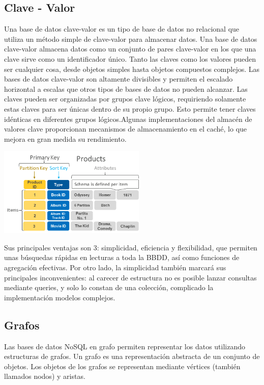 \documentclass[twoside,twocolumn]{article}
\begin{document}
\subsection{Clave - Valor}
Una base de datos clave-valor es un tipo de base de datos no relacional que utiliza un método simple de clave-valor para almacenar datos. Una base de datos clave-valor almacena datos como un conjunto de pares clave-valor en los que una clave sirve como un identificador único. Tanto las claves como los valores pueden ser cualquier cosa, desde objetos simples hasta objetos compuestos complejos. Las bases de datos clave-valor son altamente divisibles y permiten el escalado horizontal a escalas que otros tipos de bases de datos no pueden alcanzar.
Las claves pueden ser organizadas por grupos clave lógicos, requiriendo solamente estas claves para ser únicas dentro de su propio grupo. Esto permite tener claves idénticas en diferentes grupos lógicos.Algunas implementaciones del almacén de valores clave proporcionan mecanismos de almacenamiento en el caché, lo que mejora en gran medida su rendimiento.
\begin{center}
	\includegraphics[width=7cm]{./Imagenes/clavevalor} 
\end{center}


Sus principales ventajas son 3: simplicidad, eficiencia y flexibilidad, que permiten unas búsquedas rápidas en lecturas a toda la BBDD, así como funciones de agregación efectivas. Por otro lado, la simplicidad también marcará sus principales inconvenientes: al carecer de estructura no es posible lanzar consultas mediante queries, y solo lo constan de una colección, complicado la implementación modelos complejos.


\subsection{Grafos}

Las bases de datos NoSQL en grafo permiten representar los datos utilizando estructuras de grafos. Un grafo es una representación abstracta de un conjunto de objetos. Los objetos de los grafos se representan mediante vértices (también llamados nodos) y aristas.
\end{document}
